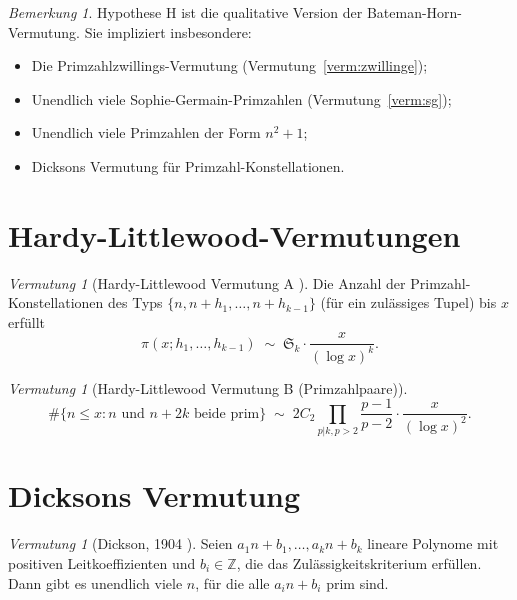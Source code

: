\documentclass[12pt,a4paper]{amsart}
\theoremstyle{definition}
\theoremstyle{remark}
\newtheorem{bemerkung}[theorem]{Bemerkung}
\newtheorem{vermutung}[theorem]{Vermutung}
\newcommand{\Z}{\mathbb{Z}}
\newcommand{\BH}{\mathfrak{S}}
\begin{document}
\begin{bemerkung}
  Hypothese H ist die qualitative Version der Bateman-Horn-Vermutung.
  Sie impliziert insbesondere:
  \begin{itemize}
    \item Die Primzahlzwillings-Vermutung (Vermutung~\ref{verm:zwillinge});
    \item Unendlich viele Sophie-Germain-Primzahlen (Vermutung~\ref{verm:sg});
    \item Unendlich viele Primzahlen der Form $n^2+1$;
    \item Dicksons Vermutung für Primzahl-Konstellationen.
  \end{itemize}
\end{bemerkung}

\section{Hardy-Littlewood-Vermutungen}\label{sec:hardy_lw}

\begin{vermutung}[Hardy-Littlewood Vermutung A \cite{HL1923}]
  \label{verm:HLA}
  Die Anzahl der Primzahl-Konstellationen des Typs
  $\{n, n+h_1, \ldots, n+h_{k-1}\}$ (für ein zulässiges Tupel) bis $x$ erfüllt
  \[
    \pi(x; h_1,\ldots,h_{k-1}) \;\sim\; \BH_k \cdot \frac{x}{(\log x)^k}.
  \]
\end{vermutung}

\begin{vermutung}[Hardy-Littlewood Vermutung B (Primzahlpaare)]
  \[
    \#\{n \leq x : n \text{ und } n+2k \text{ beide prim}\}
    \;\sim\; 2C_2 \prod_{p|k, p>2} \frac{p-1}{p-2} \cdot \frac{x}{(\log x)^2}.
  \]
\end{vermutung}

\section{Dicksons Vermutung}\label{sec:dickson}

\begin{vermutung}[Dickson, 1904 \cite{Dickson1904}]
  \label{verm:dickson}
  Seien $a_1 n + b_1, \ldots, a_k n + b_k$ lineare Polynome mit positiven
  Leitkoeffizienten und $b_i \in \Z$, die das Zulässigkeitskriterium erfüllen.
  Dann gibt es unendlich viele $n$, für die alle $a_i n + b_i$ prim sind.
\end{vermutung}
\end{document}
